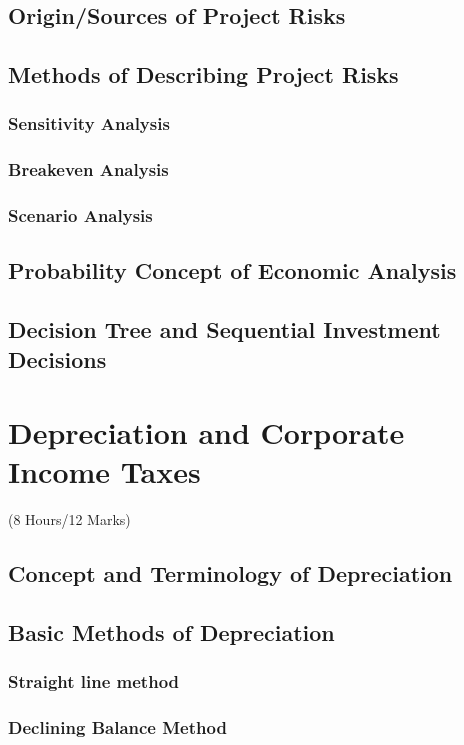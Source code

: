 \documentclass[12pt]{article}
\begin{document}
	\subsection{Origin/Sources of Project Risks}
	\subsection{Methods of Describing Project Risks}
	\subsubsection{Sensitivity Analysis}
	\subsubsection{Breakeven Analysis}
	\subsubsection{Scenario Analysis}
	\subsection{Probability Concept of Economic Analysis}
	\subsection{Decision Tree and Sequential Investment Decisions}

	\pagebreak
\section{Depreciation and Corporate Income Taxes}	
	\begin{center}(8 Hours/12 Marks)\end{center}
	\subsection{Concept and Terminology of Depreciation}
	\subsection{Basic Methods of Depreciation}
	\subsubsection{Straight line method}
	\subsubsection{Declining Balance Method}
\end{document}
